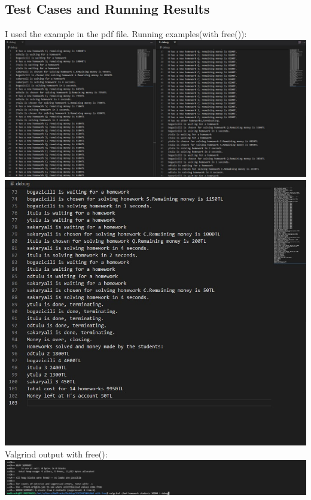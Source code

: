 \documentclass[12pt]{article}
\begin{document}
\subsection{Test Cases and Running Results}
I used the example in the pdf file.
Running examples(with free()):\\
\includegraphics[]{"output1.jpg"}\\
\includegraphics[]{"output2.jpg"}\\
Valgrind output with free():\\
\includegraphics[]{"valgrind input.jpg"}
\end{document}
